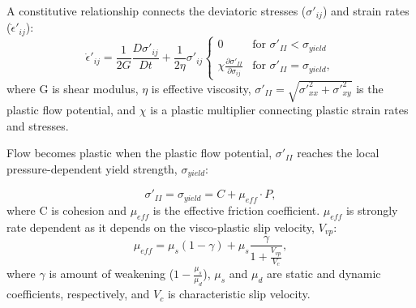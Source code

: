 \documentclass[]{proposalnsf}
\begin{document}
A constitutive relationship connects the deviatoric stresses ($\sigma'_{ij}$) and strain rates ($\dot{\epsilon}'_{ij}$):
%
\begin{equation}
  \dot\epsilon'_{ij} = \frac{1}{2G} \frac{D\sigma'_{ij}}{Dt} + \frac{1}{2\eta}\sigma'_{ij}
  \begin{cases}
        0 & \text{for $\sigma'_{II} < \sigma_{yield}$} \\
        \chi\frac{\partial\sigma'_{II}}{\partial\sigma_{ij}} & \text{for $\sigma'_{II} = \sigma_{yield}$}, 
  \end{cases}
\end{equation}
where G is shear modulus, $\eta$ is effective viscosity, $\sigma'_{II} = \sqrt{\sigma'^2_{xx} + \sigma'^2_{xy}}$ is the plastic flow potential, and $\chi$ is a plastic multiplier connecting plastic strain rates and stresses.

Flow becomes plastic when the plastic flow potential, $\sigma'_{II}$ reaches the local pressure-dependent yield strength, $\sigma_{yield}$:

\begin{equation}
	 	\sigma'_{II} = \sigma_{yield} = C + \mu_{eff} \cdot P, 
 \end{equation} 
where C is cohesion and $\mu_{eff}$ is the effective friction coefficient. $\mu_{eff}$ is strongly rate dependent as it depends on the visco-plastic slip velocity, $V_{vp}$:
\begin{equation}
 	\mu_{eff} = \mu_s(1-\gamma) + \mu_s\frac{\gamma}{1 + \frac{V_{vp}}{V_c}},
 \end{equation} 
 where  $\gamma$ is amount of weakening ($1 - \frac{\mu_s}{\mu_d}$), $\mu_s$ and $\mu_d$ are static and dynamic coefficients, respectively, and $V_c$ is characteristic slip velocity. 
\end{document}
